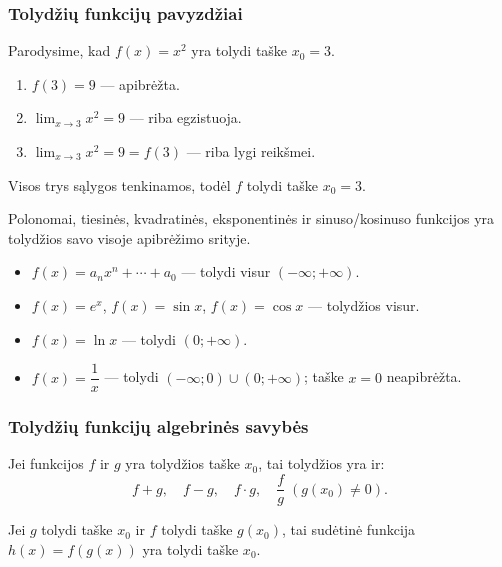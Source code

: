 \subsubsection*{Tolydžių funkcijų pavyzdžiai}

\begin{example}
Parodysime, kad $f(x)=x^2$ yra tolydi taške $x_0=3$.
\begin{enumerate}
  \item $f(3)=9$ — apibrėžta.
  \item $\displaystyle\lim_{x\to 3}x^2=9$ — riba egzistuoja.
  \item $\displaystyle\lim_{x\to 3}x^2=9=f(3)$ — riba lygi reikšmei.
\end{enumerate}
Visos trys sąlygos tenkinamos, todėl $f$ tolydi taške $x_0=3$.
\end{example}

\begin{example}
Polonomai, tiesinės, kvadratinės, eksponentinės ir sinuso/kosinuso
funkcijos yra tolydžios savo visoje apibrėžimo srityje.
\begin{itemize}
  \item $f(x)=a_n x^n+\cdots+a_0$ — tolydi visur $(-\infty;+\infty)$.
  \item $f(x)=e^x$, $f(x)=\sin x$, $f(x)=\cos x$ — tolydžios visur.
  \item $f(x)=\ln x$ — tolydi $(0;+\infty)$.
  \item $f(x)=\dfrac{1}{x}$ — tolydi $(-\infty;0)\cup(0;+\infty)$;
        taške $x=0$ neapibrėžta.
\end{itemize}
\end{example}

\subsubsection*{Tolydžių funkcijų algebrinės savybės}

\begin{theorem}
Jei funkcijos $f$ ir $g$ yra tolydžios taške $x_0$, tai tolydžios yra ir:
\[
  f+g,\quad f-g,\quad f\cdot g,\quad \frac{f}{g}\;(g(x_0)\neq 0).
\]
\end{theorem}

\begin{theorem}
Jei $g$ tolydi taške $x_0$ ir $f$ tolydi taške $g(x_0)$, tai sudėtinė
funkcija $h(x)=f(g(x))$ yra tolydi taške $x_0$.
\end{theorem}

